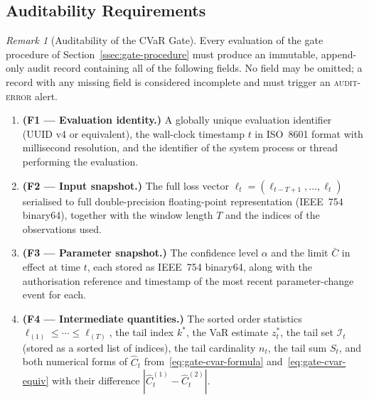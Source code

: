 \documentclass[12pt,openany]{book}
\numberwithin{equation}{chapter}
\theoremstyle{plain}
\theoremstyle{definition}
\theoremstyle{remark}
\newtheorem{remark}[theorem]{Remark}
\numberwithin{equation}{chapter}
\theoremstyle{plain}
\begin{document}
\subsection{Auditability Requirements}
\label{ssec:gate-audit}

\begin{remark}[Auditability of the CVaR Gate]
\label{rem:cvar-audit}
Every evaluation of the gate procedure of
Section~\ref{ssec:gate-procedure} must produce an immutable,
append-only audit record containing all of the following fields.
No field may be omitted; a record with any missing field is
considered incomplete and must trigger an \textsc{audit-error}
alert.

\begin{enumerate}
  \item \textbf{(F1 --- Evaluation identity.)}
        A globally unique evaluation identifier (UUID v4 or
        equivalent), the wall-clock timestamp $t$ in
        ISO~8601 format with millisecond resolution, and the
        identifier of the system process or thread performing the
        evaluation.

  \item \textbf{(F2 --- Input snapshot.)}
        The full loss vector
        $\boldsymbol{\ell}_t = (\ell_{t-T+1},\ldots,\ell_t)$
        serialised to full double-precision floating-point
        representation (IEEE~754 binary64), together with the
        window length $T$ and the indices of the observations
        used.

  \item \textbf{(F3 --- Parameter snapshot.)}
        The confidence level $\alpha$ and the limit $\bar{C}$ in
        effect at time $t$, each stored as IEEE~754 binary64, along
        with the authorisation reference and timestamp of the
        most recent parameter-change event for each.

  \item \textbf{(F4 --- Intermediate quantities.)}
        The sorted order statistics
        $\ell_{(1)}\leq\cdots\leq\ell_{(T)}$,
        the tail index $k^*$, the VaR estimate $z^*_t$,
        the tail set $\mathcal{I}_t$ (stored as a sorted list of
        indices), the tail cardinality $n_t$, the tail sum $S_t$,
        and both numerical forms of $\hat{C}_t$
        from~\eqref{eq:gate-cvar-formula}
        and~\eqref{eq:gate-cvar-equiv} with their difference
        $|\hat{C}_t^{(1)} - \hat{C}_t^{(2)}|$.


\end{enumerate}
\end{remark}
\end{document}
